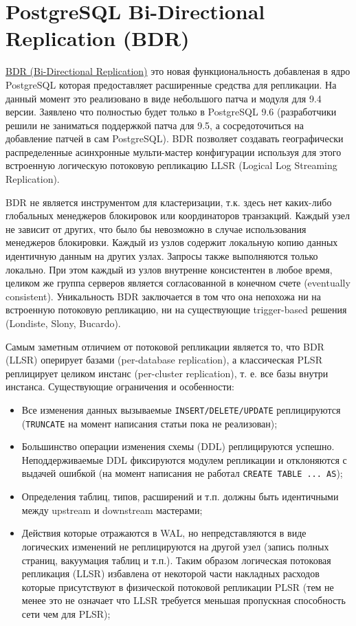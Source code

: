 \section{PostgreSQL Bi-Directional Replication (BDR)}
\label{sec:bdr}

\href{https://2ndquadrant.com/en/resources/bdr/}{BDR (Bi-Directional Replication)} это новая функциональность добавленая в ядро PostgreSQL которая предоставляет расширенные средства для репликации. На данный момент это реализовано в виде небольшого патча и модуля для 9.4 версии. Заявлено что полностью будет только в PostgreSQL 9.6 (разработчики решили не заниматься поддержкой патча для 9.5, а сосредоточиться на добавление патчей в сам PostgreSQL). BDR позволяет создавать географически распределенные асинхронные мульти-мастер конфигурации используя для этого встроенную логическую потоковую репликацию LLSR (Logical Log Streaming Replication).

BDR не является инструментом для кластеризации, т.к. здесь нет каких-либо глобальных менеджеров блокировок или координаторов транзакций. Каждый узел не зависит от других, что было бы невозможно в случае использования менеджеров блокировки. Каждый из узлов содержит локальную копию данных идентичную данным на других узлах. Запросы также выполняются только локально. При этом каждый из узлов внутренне консистентен в любое время, целиком же группа серверов является согласованной в конечном счете (eventually consistent). Уникальность BDR заключается в том что она непохожа ни на встроенную потоковую репликацию, ни на существующие trigger-based решения (Londiste, Slony, Bucardo).

Самым заметным отличием от потоковой репликации является то, что BDR (LLSR) оперирует базами (per-database replication), а классическая PLSR реплицирует целиком инстанс (per-cluster replication), т. е. все базы внутри инстанса. Существующие ограничения и особенности:

\begin{itemize}
  \item Все изменения данных вызываемые \lstinline!INSERT/DELETE/UPDATE! реплицируются (\lstinline!TRUNCATE! на момент написания статьи пока не реализован);
  \item Большинство операции изменения схемы (DDL) реплицируются успешно. Неподдерживаемые DDL фиксируются модулем репликации и отклоняются с выдачей ошибкой (на момент написания не работал \lstinline!CREATE TABLE ... AS!);
  \item Определения таблиц, типов, расширений и т.п. должны быть идентичными между upstream и downstream мастерами;
  \item Действия которые отражаются в WAL, но непредставляются в виде логических изменений не реплицируются на другой узел (запись полных страниц, вакуумация таблиц и т.п.). Таким образом логическая потоковая репликация (LLSR) избавлена от некоторой части накладных расходов которые присутствуют в физической потоковой репликации PLSR (тем не менее это не означает что LLSR требуется меньшая пропускная способность сети чем для PLSR);
\end{itemize}

